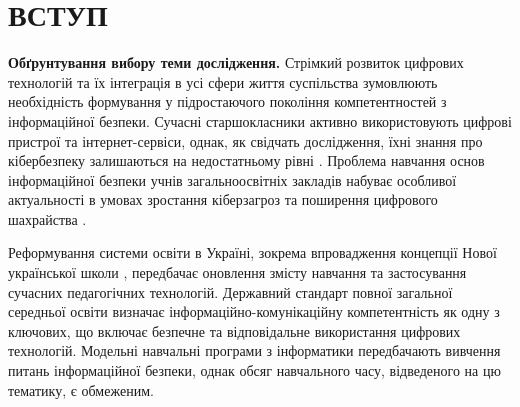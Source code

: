 \section*{\centering ВСТУП}




\textbf{Обґрунтування вибору теми дослідження.} 
Стрімкий розвиток цифрових технологій та їх інтеграція в усі сфери життя суспільства зумовлюють необхідність формування у підростаючого покоління компетентностей з інформаційної безпеки. Сучасні старшокласники активно використовують цифрові пристрої та інтернет-сервіси, однак, як свідчать дослідження, їхні знання про кібербезпеку залишаються на недостатньому рівні \cite{Mishra202436}. Проблема навчання основ інформаційної безпеки учнів загальноосвітніх закладів набуває особливої актуальності в умовах зростання кіберзагроз та поширення цифрового шахрайства \cite{Spirin_Kovalchuk_2011}.

Реформування системи освіти в Україні, зокрема впровадження концепції Нової української школи \cite{nush_mon_compressed}, передбачає оновлення змісту навчання та застосування сучасних педагогічних технологій. Державний стандарт повної загальної середньої освіти \cite{KMU_898_2020} визначає інформаційно-комунікаційну компетентність як одну з ключових, що включає безпечне та відповідальне використання цифрових технологій. Модельні навчальні програми з інформатики \cite{inform_7_9_rivkind} передбачають вивчення питань інформаційної безпеки, однак обсяг навчального часу, відведеного на цю тематику, є обмеженим.

